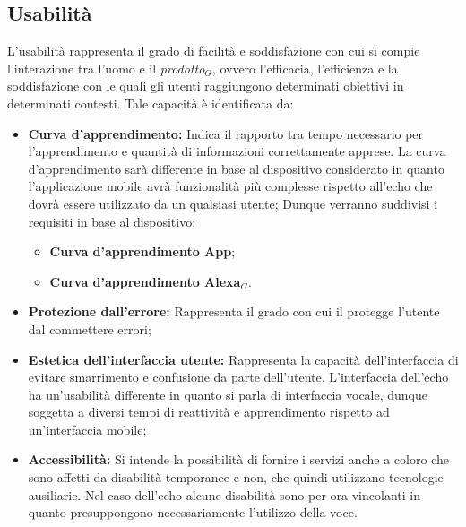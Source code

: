 \subsection{Usabilità}
L'usabilità rappresenta il grado di facilità e soddisfazione con cui si compie l'interazione tra l'uomo e il \textit{prodotto$_{G}$}, ovvero l'efficacia, l'efficienza e la soddisfazione con le quali gli utenti raggiungono determinati obiettivi in determinati contesti.
Tale capacità è identificata da:
\begin{itemize}
	\item \textbf{Curva d'apprendimento:} Indica il rapporto tra tempo necessario per l'apprendimento e quantità di informazioni correttamente apprese.
	La curva d'apprendimento sarà differente in base al dispositivo considerato in quanto l'applicazione mobile avrà funzionalità più complesse rispetto all'echo che dovrà essere utilizzato da un qualsiasi utente; Dunque verranno suddivisi i requisiti in base al dispositivo:
	\begin{itemize}
		\item \textbf{Curva d'apprendimento App};
		\item \textbf{Curva d'apprendimento Alexa$_{G}$}.
	\end{itemize}
	\item \textbf{Protezione dall'errore:} Rappresenta il grado con cui il protegge l'utente dal commettere errori;
	\item \textbf{Estetica dell'interfaccia utente:} Rappresenta la capacità dell'interfaccia di evitare smarrimento e confusione da parte dell'utente.
	L'interfaccia dell'echo ha un'usabilità differente in quanto si parla di interfaccia vocale, dunque soggetta a diversi tempi di reattività e apprendimento rispetto ad un'interfaccia mobile;
	\item \textbf{Accessibilità:} Si intende la possibilità di fornire i servizi anche a coloro che sono affetti da disabilità temporanee e non, che quindi utilizzano tecnologie ausiliarie.
	Nel caso dell'echo alcune disabilità sono per ora vincolanti in quanto presuppongono necessariamente l'utilizzo della voce.
\end{itemize}

